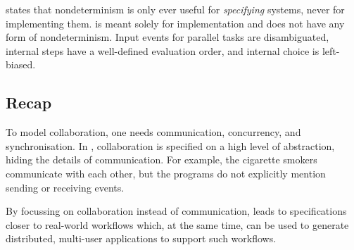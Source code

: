  states that nondeterminism is only ever useful for \emph{specifying} systems, never for implementing them.
\TOPHAT is meant solely for implementation and does not have any form of nondeterminism.
Input events for parallel tasks are disambiguated, internal steps have a well-defined evaluation order, and internal choice is left-biased.


\subsection{Recap}

To model collaboration, one needs communication, concurrency, and synchronisation.
In \TOP, collaboration is specified on a high level of abstraction, hiding the details of communication.
For example, the cigarette smokers communicate with each other, but the programs do not explicitly mention sending or receiving events.

By focussing on collaboration instead of communication, \TOP leads to specifications closer to real-world workflows which, at the same time, can be used to generate distributed, multi-user applications to support such workflows.
